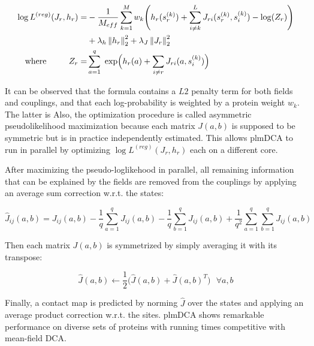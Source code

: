         \begin{equation}
            \begin{split}
                \log{L^{(reg)}}(J_r, h_r) = & -\frac{1}{M_{eff}} \sum\limits_{k=1}^M w_k \Bigg( h_r(s_r^{(k)}) 
                    + \sum\limits_{i \neq k}^L J_{ri}(s_r^{(k)}, s_i^{(k)}) - \log(Z_r) \Bigg) \\
                & + \lambda_h \left\lVert h_r\right\rVert_2^2 + \lambda_J \left\lVert J_r\right\rVert_2^2 \\
                \text{where} \ \ \ \ \ \ \ \ Z_r = & \sum\limits_{a=1}^q \text{ exp}\Big(h_r(a) + \sum\limits_{i \neq r} J_{ri}(a, s_i^{(k)})\Big)
            \end{split}
        \end{equation}

        It can be observed that the formula contains a $L2$ penalty term for both fields and couplings,
        and that each log-probability is weighted by a protein weight $w_k$.
        The latter is \todo{}
        Also, the optimization procedure is called asymmetric pseudolikelihood maximization because 
        each matrix $J(a, b)$ is supposed to be symmetric but is in practice
        independently estimated. This allows plmDCA to run in parallel by optimizing $\log{L^{(reg)}}(J_r, h_r)$ each on a different core.

        After maximizing the pseudo-loglikehood in parallel, all remaining information 
        that can be explained by the fields are removed from the couplings by applying
        an average sum correction w.r.t. the states:

        \begin{equation}
            \hat{J}_{ij}(a, b) = J_{ij}(a, b) - \frac{1}{q} \sum\limits_{a=1}^q J_{ij}(a, b) - \frac{1}{q} \sum\limits_{b=1}^q J_{ij}(a, b) 
            + \frac{1}{q^2} \sum\limits_{a=1}^q \sum\limits_{b=1}^q J_{ij}(a, b)
        \end{equation}

        Then each matrix $J(a, b)$ is symmetrized by simply averaging it with its transpose:
        
        \begin{equation}
            \hat{J}(a, b) \leftarrow \frac{1}{2} \big( \hat{J}(a, b) + \hat{J}(a, b)^T \big) \ \ \ \forall a, b
        \end{equation}

        Finally, a contact map is predicted by norming $\hat{J}$ over the states and applying an average product correction w.r.t. the sites.
        plmDCA shows remarkable performance on diverse sets of proteins with running times competitive with mean-field DCA.


